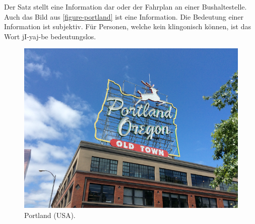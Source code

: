 \begin{example} Der Satz  stellt eine Information dar oder der Fahrplan an einer Bushaltestelle. Auch das Bild aus \autoref{figure-portland} ist eine Information. Die Bedeutung einer Information ist subjektiv. Für Personen, welche kein klingonisch können, ist das Wort jI-yaj-be bedeutungslos.

\begin{figure}[htb]
\centering
\includegraphics[scale=0.25]{portland.png}
\caption{Portland (USA).}
\label{figure-portland}
\end{figure}

\end{example}